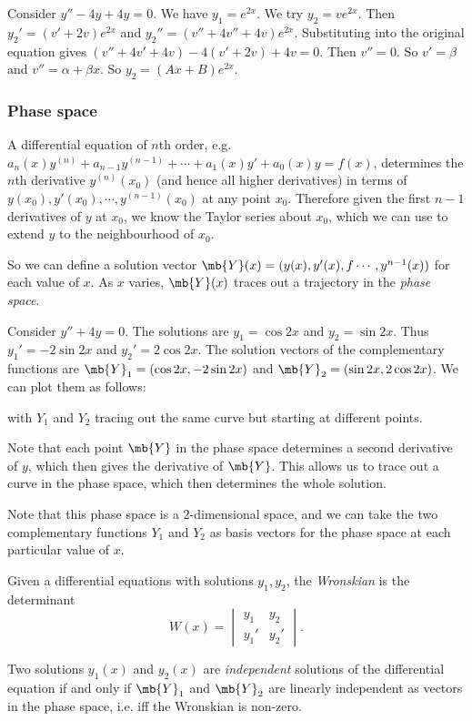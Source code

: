 \documentclass[a4paper]{article}
\begin{document}
\begin{eg}
  Consider $y'' - 4y + 4y = 0$. We have $y_1 = e^{2x}$. We try $y_2 = ve^{2x}$. Then $y_2' = (v' + 2v)e^{2x}$ and $y_2'' = (v'' + 4v'' + 4v)e^{2x}$. Substituting into the original equation gives $(v'' + 4v' + 4v) - 4(v' + 2v) + 4v = 0$. Then $v'' = 0$. So $v' = \beta$ and $v'' = \alpha + \beta x$. So $y_2 = (Ax + B)e^{2x}$.
\end{eg}

\subsubsection{Phase space}
A differential equation of $n$th order, e.g. $a_n(x) y^{(n)} + a_{n - 1}y^{(n - 1)} + \cdots + a_1(x) y' + a_0 (x) y = f(x)$, determines the $n$th derivative $y^{(n)} (x_0)$ (and hence all higher derivatives) in terms of $y(x_0), y'(x_0), \cdots ,y^{(n - 1)}(x_0)$ at any point $x_0$. Therefore given the first $n - 1$ derivatives of $y$ at $x_0$, we know the Taylor series about $x_0$, which we can use to extend $y$ to the neighbourhood of $x_0$.

So we can define a solution vector $\mb{Y}(x) = (y(x), y'(x),f \cdots , y^{n - 1}(x))$ for each value of $x$. As $x$ varies, $\mb{Y}(x)$ traces out a trajectory in the \emph{phase space}.

\begin{eg}
  Consider $y'' + 4y = 0$. The solutions are $y_1 = \cos 2x$ and $y_2 = \sin 2x$. Thus $y_1' = -2\sin 2x$ and $y_2' = 2\cos 2x$. The solution vectors of the complementary functions are $\mb{Y}_1 = (\cos 2x, -2\sin 2x)$ and $\mb{Y}_2 = (\sin 2x, 2\cos 2x)$. We can plot them as follows:


with $Y_1$ and $Y_2$ tracing out the same curve but starting at different points.
\end{eg}

Note that each point $\mb{Y}$ in the phase space determines a second derivative of $y$, which then gives the derivative of $\mb{Y}$. This allows us to trace out a curve in the phase space, which then determines the whole solution.

Note that this phase space is a 2-dimensional space, and we can take the two complementary functions $Y_1$ and $Y_2$ as basis vectors for the phase space at each particular value of $x$.

\begin{defi}[Wronskian]
  Given a differential equations with solutions $y_1, y_2$, the \emph{Wronskian} is the determinant
\[
W(x) = \begin{vmatrix}y_1 & y_2 \\ y_1' & y_2'\end{vmatrix}.
\]
\end{defi}
\begin{defi}
  Two solutions $y_1(x)$ and $y_2(x)$ are \emph{independent} solutions of the differential equation if and only if $\mb{Y}_1$  and $\mb{Y}_2$  are linearly independent as vectors in the phase space, i.e. iff the Wronskian is non-zero.
\end{defi}
\end{document}
